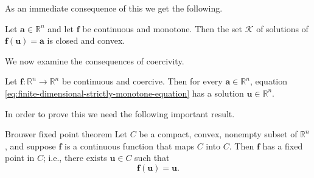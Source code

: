As an immediate consequence of this we get the following.

\begin{Theorem}
\label{thm:finite-dimensional-monotone-solution-set-closed-convex}
Let $\bm{a}\in\mathbb{R}^n$ and let $\bm{f}$ be continuous and monotone. Then the set $\mathcal{K}$ of solutions of $\bm{f}(\bm{u})=\bm{a}$ is closed and convex.
\end{Theorem}

\begingroup
\renewcommand{\endProof}{\par\nobreak\hfill$\blacksquare$\par\vspace{0.1cm}}
\endgroup

We now examine the consequences of coercivity.

\begin{Theorem}
\label{thm:finite-dimensional-coercive-surjectivity}
Let $\bm{f}:\mathbb{R}^n\to\mathbb{R}^n$ be continuous and coercive. Then for every $\bm{a}\in\mathbb{R}^n$, equation \eqref{eq:finite-dimensional-strictly-monotone-equation} has a solution $\bm{u}\in\mathbb{R}^n$.
\end{Theorem}

In order to prove this we need the following important result.

\begin{Theorem}{Brouwer fixed point theorem}
\label{thm:brouwer-fixed-point}
Let $C$ be a compact, convex, nonempty subset of $\mathbb{R}^n$, and suppose $\bm{f}$ is a continuous function that maps $C$ into $C$. Then $\bm{f}$ has a fixed point in $C$; i.e., there exists $\bm{u}\in C$ such that
\begin{equation}\label{eq:brouwer-fixed-point-equation}
\bm{f}(\bm{u})=\bm{u}.
\end{equation}

\end{Theorem}


